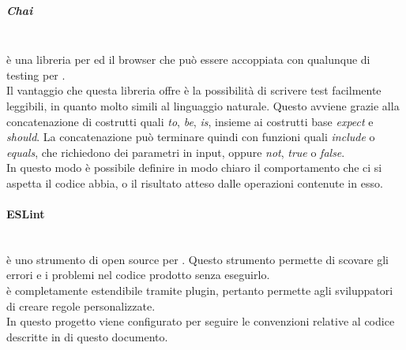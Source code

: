 \subparagraph{Chai}\mbox{}\\
 è una libreria  per  ed il browser che può essere accoppiata con qualunque  di testing per .\\
Il vantaggio che questa libreria offre è la possibilità di scrivere test facilmente leggibili, in quanto molto simili al linguaggio naturale. Questo avviene grazie alla concatenazione di costrutti quali \textit{to}, \textit{be}, \textit{is}, insieme ai costrutti base \textit{expect} e \textit{should}. La concatenazione può terminare quindi con funzioni quali \textit{include} o \textit{equals}, che richiedono dei parametri in input, oppure \textit{not}, \textit{true} o \textit{false}.\\
In questo modo è possibile definire in modo chiaro il comportamento che ci si aspetta il codice abbia, o il risultato atteso dalle operazioni contenute in esso.

\paragraph{ESLint} \label{sec:eslint}\mbox{}\\
 è uno strumento di  open source per . Questo strumento permette di scovare gli errori e i problemi nel codice prodotto senza eseguirlo.\\  è completamente estendibile tramite plugin, pertanto permette agli sviluppatori di creare regole personalizzate.\\
In questo progetto  viene configurato per seguire le convenzioni relative al codice descritte in  di questo documento.